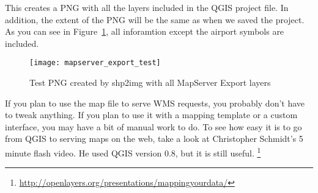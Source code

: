 This creates a PNG with all the layers included in the QGIS project file. 
In addition, the extent of the PNG will be the same as when we saved the 
project. As you can see in Figure~\ref{fig:mapserver_export_test}, all 
inforamtion except the airport symbols are included.

\begin{figure}[ht]
\begin{center}
  \caption{Test PNG created by shp2img with all MapServer Export layers \nixcaption}
  \label{fig:mapserver_export_test}\smallskip
  \texttt{[image: mapserver\_export\_test]}
\end{center}
\end{figure}

If you plan to use the map file to serve WMS requests, you probably don't
have to tweak anything. If you plan to use it with a mapping template or a
custom interface, you may have a bit of manual work to do. To see how easy
it is to go from QGIS to serving maps on the web, take a look at
Christopher Schmidt's 5 minute flash video. He used QGIS version 0.8, but it 
is still useful.
\footnote{\url{http://openlayers.org/presentations/mappingyourdata/}}
